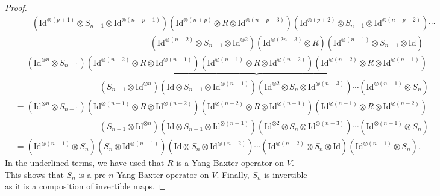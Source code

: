 \documentclass[a4paper,reqno,10pt]{amsart}
\theoremstyle{plain}
\theoremstyle{definition}
\theoremstyle{remark}
\begin{document}
\begin{proof}
\begin{align*}
    &\qquad(\mathrm{Id}^{\otimes(p+1)}\otimes S_{n-1}\otimes \mathrm{Id}^{\otimes(n-p-1)})(\mathrm{Id}^{\otimes(n+p)}\otimes R\otimes\mathrm{Id}^{\otimes (n-p-3)})(\mathrm{Id}^{\otimes(p+2)}\otimes S_{n-1}\otimes \mathrm{Id}^{\otimes(n-p-2)})\cdots\\
&\qquad\qquad\qquad\qquad\qquad\qquad\qquad\qquad(\mathrm{Id}^{\otimes(n-2)}\otimes S_{n-1}\otimes \mathrm{Id}^{\otimes 2})(\mathrm{Id}^{\otimes (2n-3)}\otimes R)(\mathrm{Id}^{\otimes(n-1)}\otimes S_{n-1}\otimes \mathrm{Id})\\
    &=(\mathrm{Id}^{\otimes n}\otimes S_{n-1})\underbrace{(\mathrm{Id}^{\otimes (n-2)}\otimes R\otimes \mathrm{Id}^{\otimes(n-1)})(\mathrm{Id}^{\otimes (n-1)}\otimes R\otimes \mathrm{Id}^{\otimes(n-2)})(\mathrm{Id}^{\otimes (n-2)}\otimes R\otimes \mathrm{Id}^{\otimes(n-1)})}\\
    &\qquad\qquad\qquad\qquad\qquad(S_{n-1}\otimes \mathrm{Id}^{\otimes n})(\mathrm{Id}\otimes S_{n-1}\otimes \mathrm{Id}^{\otimes(n-1)})(\mathrm{Id}^{\otimes 2}\otimes S_{n}\otimes \mathrm{Id}^{\otimes(n-3)})\cdots (\mathrm{Id}^{\otimes (n-1)}\otimes S_{n})
    \end{align*}
    \begin{align*}
    &=(\mathrm{Id}^{\otimes n}\otimes S_{n-1})(\mathrm{Id}^{\otimes (n-1)}\otimes R\otimes \mathrm{Id}^{\otimes(n-2)})(\mathrm{Id}^{\otimes (n-2)}\otimes R\otimes \mathrm{Id}^{\otimes(n-1)})(\mathrm{Id}^{\otimes (n-1)}\otimes R\otimes \mathrm{Id}^{\otimes(n-2)})\\
    &\qquad\qquad\qquad\qquad\qquad(S_{n-1}\otimes \mathrm{Id}^{\otimes n})(\mathrm{Id}\otimes S_{n-1}\otimes \mathrm{Id}^{\otimes(n-1)})(\mathrm{Id}^{\otimes 2}\otimes S_{n}\otimes \mathrm{Id}^{\otimes(n-3)})\cdots (\mathrm{Id}^{\otimes (n-1)}\otimes S_{n})\\
    &=(\mathrm{Id}^{\otimes (n-1)}\otimes S_{n})(S_{n}\otimes \mathrm{Id}^{\otimes (n-1)})(\mathrm{Id}\otimes S_{n}\otimes \mathrm{Id}^{\otimes(n-2)}) \cdots (\mathrm{Id}^{\otimes (n-2)} \otimes S_n \otimes \mathrm{Id}) (\mathrm{Id}^{\otimes (n-1)}\otimes S_{n}).
\end{align*}In the underlined terms, we have used that $R$ is a Yang-Baxter operator on $V$. This shows that $S_n$ is a pre-$n$-Yang-Baxter operator on $V$. Finally, $S_n$ is invertible as it is a composition of invertible maps.
\end{proof}
\end{document}
